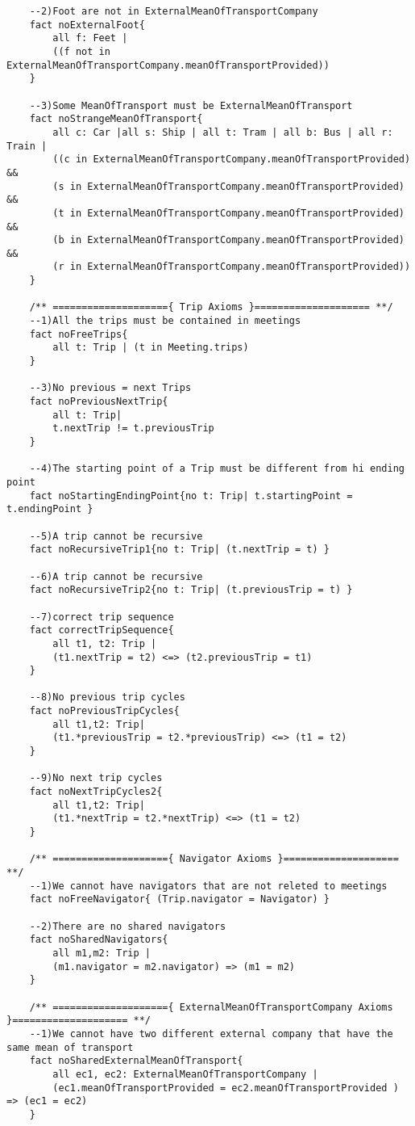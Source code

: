 \documentclass[a4paper,leqno]{book}
\begin{document}
\begin{lstlisting}
	--2)Foot are not in ExternalMeanOfTransportCompany
	fact noExternalFoot{
		all f: Feet |
		((f not in ExternalMeanOfTransportCompany.meanOfTransportProvided))
	}
	
	--3)Some MeanOfTransport must be ExternalMeanOfTransport
	fact noStrangeMeanOfTransport{
		all c: Car |all s: Ship | all t: Tram | all b: Bus | all r: Train |
		((c in ExternalMeanOfTransportCompany.meanOfTransportProvided) &&
		(s in ExternalMeanOfTransportCompany.meanOfTransportProvided) &&
		(t in ExternalMeanOfTransportCompany.meanOfTransportProvided) &&
		(b in ExternalMeanOfTransportCompany.meanOfTransportProvided) &&
		(r in ExternalMeanOfTransportCompany.meanOfTransportProvided))
	}
	
	/** ===================={ Trip Axioms }==================== **/
	--1)All the trips must be contained in meetings
	fact noFreeTrips{
		all t: Trip | (t in Meeting.trips)
	}
	
	--3)No previous = next Trips
	fact noPreviousNextTrip{
		all t: Trip|
		t.nextTrip != t.previousTrip
	}
	
	--4)The starting point of a Trip must be different from hi ending point
	fact noStartingEndingPoint{no t: Trip| t.startingPoint = t.endingPoint }
	
	--5)A trip cannot be recursive
	fact noRecursiveTrip1{no t: Trip| (t.nextTrip = t) }
	
	--6)A trip cannot be recursive
	fact noRecursiveTrip2{no t: Trip| (t.previousTrip = t) }
	
	--7)correct trip sequence
	fact correctTripSequence{
		all t1, t2: Trip |
		(t1.nextTrip = t2) <=> (t2.previousTrip = t1)
	}
	
	--8)No previous trip cycles
	fact noPreviousTripCycles{
		all t1,t2: Trip|
		(t1.*previousTrip = t2.*previousTrip) <=> (t1 = t2)	
	}
	
	--9)No next trip cycles
	fact noNextTripCycles2{
		all t1,t2: Trip|
		(t1.*nextTrip = t2.*nextTrip) <=> (t1 = t2)	
	}
	
	/** ===================={ Navigator Axioms }==================== **/
	--1)We cannot have navigators that are not releted to meetings
	fact noFreeNavigator{ (Trip.navigator = Navigator) }
	
	--2)There are no shared navigators
	fact noSharedNavigators{
		all m1,m2: Trip |
		(m1.navigator = m2.navigator) => (m1 = m2)
	}
	
	/** ===================={ ExternalMeanOfTransportCompany Axioms }==================== **/
	--1)We cannot have two different external company that have the same mean of transport
	fact noSharedExternalMeanOfTransport{
		all ec1, ec2: ExternalMeanOfTransportCompany |
		(ec1.meanOfTransportProvided = ec2.meanOfTransportProvided ) => (ec1 = ec2)
	}
	

\end{lstlisting}
\end{document}
